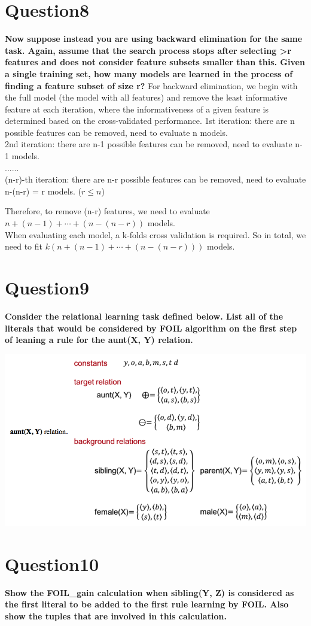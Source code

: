 \documentclass[paper=a4, fontsize=11pt]{scrartcl} %
\numberwithin{equation}{section} %
\numberwithin{figure}{section} %
\numberwithin{table}{section} %
\begin{document}
\newpage
\section*{Question8}
\textbf{Now suppose instead you are using backward elimination for the same task. Again, assume that the search process stops after selecting >r features and does not consider feature subsets smaller than this. Given a single training set, how many models are learned in the process of finding a feature subset of size r?}
\bigbreak
For backward elimination, we begin with the full model (the model with all features) and remove the least informative feature at each iteration, where the informativeness of a given feature is determined based on the cross-validated performance. 
\bigbreak
1st iteration: there are n possible features can be removed, need to evaluate n models. \\
2nd iteration: there are n-1 possible features can be removed, need to evaluate n-1 models. \\
......\\
(n-r)-th iteration: there are n-r possible features can be removed, need to evaluate n-(n-r) = r models. ($r \leq n$)
\bigbreak

Therefore, to remove (n-r) features, we need to evaluate $n + (n-1) + \cdots + (n-(n-r))$ models. \\

When evaluating each model, a k-folds cross validation is required. So in total, we need to fit $k(n + (n-1) + \cdots + (n-(n-r)))$ models. 



\newpage
\section*{Question9}
\textbf{Consider the relational learning task defined below. List all of the literals that would be considered by FOIL algorithm on the first step of leaning a rule for the aunt(X, Y) relation. }
\begin{center}
	\includegraphics[scale=.4]{pics/hw5_9.png}
\end{center}



\newpage
\section*{Question10}
\textbf{Show the FOIL\_gain calculation when sibling(Y, Z) is considered as the first literal to be added to the first rule learning by FOIL. Also show the tuples that are involved in this calculation.}
\end{document}
